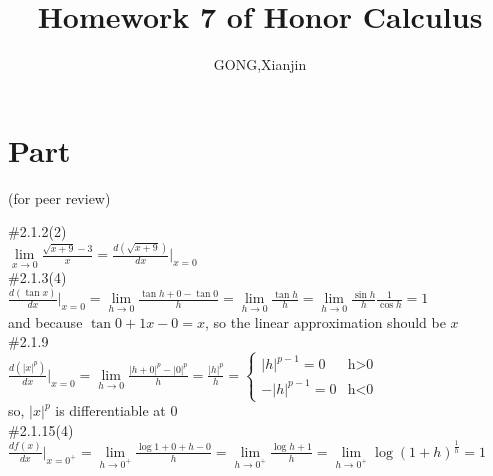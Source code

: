 \documentclass{article}
\author{GONG,Xianjin}
\title{Homework 7 of Honor Calculus}
\begin{document}
\maketitle

\section{\textcolor[rgb]{0.70,0.00,0.00}{Part \uppercase\expandafter{}}}(for peer review)

\vspace{3.5mm}

\textcolor[rgb]{0.00,0.00,0.50}{\#2.1.2(2)}\\

$\lim \limits_{x \to 0}\displaystyle\frac{\sqrt{x+9}-3}{x}=\displaystyle\frac{d(\sqrt{x+9})}{dx}\bigg|_{x=0}$\\

\textcolor[rgb]{0.00,0.00,0.50}{\#2.1.3(4)}\\

$\displaystyle\frac{d(\tan x)}{dx}\bigg|_{x=0}=\lim \limits_{h \to 0}\frac{\tan{h+0}-\tan0}{h}=\lim \limits_{h \to 0}\frac{\tan h}{h}=\lim \limits_{h \to 0}\frac{\sin h}{h}\frac{1}{\cos h}=1$\\

and because $\tan0+1{x-0}=x$, so the linear approximation should be $x$\\

\textcolor[rgb]{0.00,0.00,0.50}{\#2.1.9}\\

$\displaystyle\frac{d\left(|x|^p\right)}{dx}\bigg|_{x=0}=\lim \limits_{h \to 0}\frac{|h+0|^p-|0|^p}{h}=\frac{|h|^p}{h}=
\begin{cases}
|h|^{p-1}=0& \text{h$>$0}\\
-|h|^{p-1}=0& \text{h$<$0}
\end{cases}$\\

so, $|x|^p$ is differentiable at 0\\

\textcolor[rgb]{0.00,0.00,0.50}{\#2.1.15(4)}\\

$\displaystyle\frac{df(x)}{dx}\bigg|_{x=0^+}=\lim \limits_{h \to 0^+}\frac{\log{1+0+h}-0}{h}=\lim \limits_{h \to 0^+}\frac{\log{h+1}}{h}=\lim \limits_{h \to 0^+}\log(1+h)^{\frac{1}{h}}=1$\\

$ $\\
\end{document}
